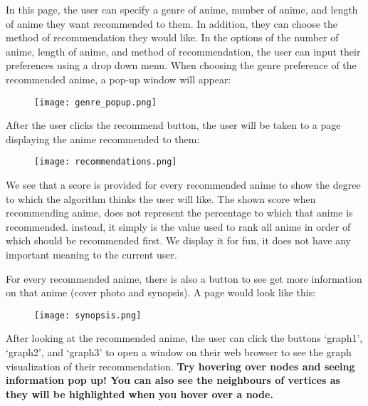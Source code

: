 \documentclass[fontsize=11pt]{article}
\begin{document}
\newpage

\item[] In this page, the user can specify a genre of anime, number of anime, and length of anime they want recommended to them. In addition, they can choose the method of recommendation they would like. In the options of the number of anime, length of anime, and method of recommendation, the user can input their preferences using a drop down menu. When choosing the genre preference of the recommended anime, a pop-up window will appear:

\begin{figure}[htp]
    \centering
    \texttt{[image: genre\_popup.png]}
\end{figure}

\newpage

\item[] After the user clicks the recommend button, the user will be taken to a page displaying the anime recommended to them:
\begin{figure}[htp]
    \centering
    \texttt{[image: recommendations.png]}
\end{figure}

\item[]We see that a score is provided for every recommended anime to show the degree to which the algorithm thinks the user will like. The shown score when recommending anime, does not represent the percentage to which that anime is recommended. instead, it simply is the value used to rank all anime in order of which should be recommended first. We display it for fun, it does not have any important meaning to the current user. 

\item[]For every recommended anime, there is also a button to see get more information on that anime (cover photo and synopsis). A page would look like this:
\begin{figure}[htp]
    \centering
    \texttt{[image: synopsis.png]}
\end{figure}

\item[] After looking at the recommended anime, the user can click the buttons `graph1', `graph2', and `graph3' to open a window on their web browser to see the graph visualization of their recommendation. \textbf{Try hovering over nodes and seeing information pop up! You can also see the neighbours of vertices as they will be highlighted when you hover over a node.}
\end{document}
